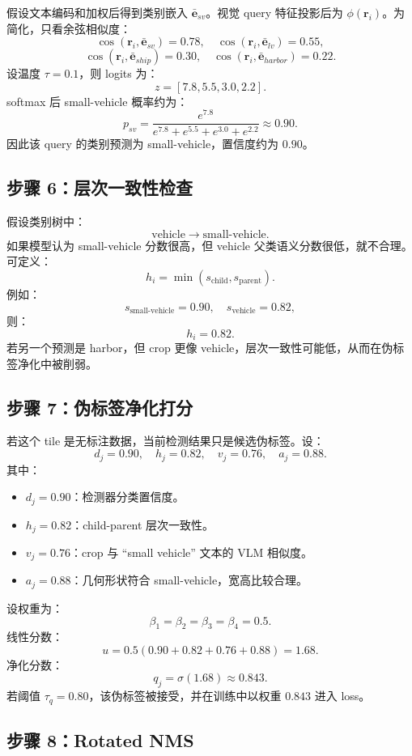 \documentclass[11pt,a4paper]{ctexart}
\begin{document}
假设文本编码和加权后得到类别嵌入 $\bar{\bm e}_{sv}$。视觉 query 特征投影后为 $\phi(\bm r_i)$。为简化，只看余弦相似度：
\[
\cos(\bm r_i,\bar{\bm e}_{sv})=0.78,
\quad
\cos(\bm r_i,\bar{\bm e}_{lv})=0.55,
\]
\[
\cos(\bm r_i,\bar{\bm e}_{ship})=0.30,
\quad
\cos(\bm r_i,\bar{\bm e}_{harbor})=0.22.
\]
设温度 $\tau=0.1$，则 logits 为：
\[
z=[7.8,5.5,3.0,2.2].
\]
softmax 后 small-vehicle 概率约为：
\[
p_{sv}=\frac{e^{7.8}}{e^{7.8}+e^{5.5}+e^{3.0}+e^{2.2}}
\approx0.90.
\]
因此该 query 的类别预测为 small-vehicle，置信度约为 $0.90$。

\subsection{步骤 6：层次一致性检查}

假设类别树中：
\[
\text{vehicle}\rightarrow\text{small-vehicle}.
\]
如果模型认为 small-vehicle 分数很高，但 vehicle 父类语义分数很低，就不合理。可定义：
\[
h_i=\min(s_{\text{child}},s_{\text{parent}}).
\]
例如：
\[
s_{\text{small-vehicle}}=0.90,\quad s_{\text{vehicle}}=0.82,
\]
则：
\[
h_i=0.82.
\]
若另一个预测是 harbor，但 crop 更像 vehicle，层次一致性可能低，从而在伪标签净化中被削弱。

\subsection{步骤 7：伪标签净化打分}

若这个 tile 是无标注数据，当前检测结果只是候选伪标签。设：
\[
d_j=0.90,\quad h_j=0.82,\quad v_j=0.76,\quad a_j=0.88.
\]
其中：
\begin{itemize}
  \item $d_j=0.90$：检测器分类置信度。
  \item $h_j=0.82$：child-parent 层次一致性。
  \item $v_j=0.76$：crop 与 ``small vehicle'' 文本的 VLM 相似度。
  \item $a_j=0.88$：几何形状符合 small-vehicle，宽高比较合理。
\end{itemize}

设权重为：
\[
\beta_1=\beta_2=\beta_3=\beta_4=0.5.
\]
线性分数：
\[
u=0.5(0.90+0.82+0.76+0.88)=1.68.
\]
净化分数：
\[
q_j=\sigma(1.68)\approx0.843.
\]
若阈值 $\tau_q=0.80$，该伪标签被接受，并在训练中以权重 $0.843$ 进入 loss。

\subsection{步骤 8：Rotated NMS}
\end{document}
